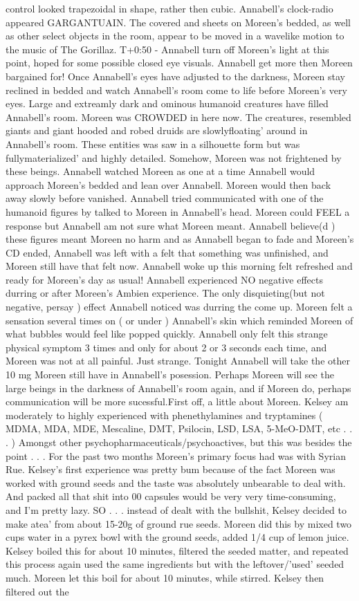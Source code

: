 \documentclass[12pt]{book}
\begin{document}
control looked trapezoidal in shape, rather then cubic. Annabell's clock-radio appeared GARGANTUAIN. The covered and sheets on Moreen's bedded, as well as other select objects in the room, appear to be moved in a wavelike motion to the music of The Gorillaz. T+0:50 - Annabell turn off Moreen's light at this point, hoped for some possible closed eye visuals. Annabell get more then Moreen bargained for! Once Annabell's eyes have adjusted to the darkness, Moreen stay reclined in bedded and watch Annabell's room come to life before Moreen's very eyes. Large and extreamly dark and ominous humanoid creatures have filled Annabell's room. Moreen was CROWDED in here now. The creatures, resembled giants and giant hooded and robed druids are slowlyfloating' around in Annabell's room. These entities was saw in a silhouette form but was fullymaterialized' and highly detailed. Somehow, Moreen was not frightened by these beings. Annabell watched Moreen as one at a time Annabell would approach Moreen's bedded and lean over Annabell. Moreen would then back away slowly before vanished. Annabell tried communicated with one of the humanoid figures by talked to Moreen in Annabell's head. Moreen could FEEL a response but Annabell am not sure what Moreen meant. Annabell believe(d ) these figures meant Moreen no harm and as Annabell began to fade and Moreen's CD ended, Annabell was left with a felt that something was unfinished, and Moreen still have that felt now. Annabell woke up this morning felt refreshed and ready for Moreen's day as usual! Annabell experienced NO negative effects durring or after Moreen's Ambien experience. The only disquieting(but not negative, persay ) effect Annabell noticed was durring the come up. Moreen felt a sensation several times on ( or under ) Annabell's skin which reminded Moreen of what bubbles would feel like popped quickly. Annabell only felt this strange physical symptom 3 times and only for about 2 or 3 seconds each time, and Moreen was not at all painful. Just strange. Tonight Annabell will take the other 10 mg Moreen still have in Annabell's posession. Perhaps Moreen will see the large beings in the darkness of Annabell's room again, and if Moreen do, perhaps communication will be more sucessful.First off, a little about Moreen. Kelsey am moderately to highly experienced with phenethylamines and tryptamines ( MDMA, MDA, MDE, Mescaline, DMT, Psilocin, LSD, LSA, 5-MeO-DMT, etc . . .   ) Amongst other psychopharmaceuticals/psychoactives, but this was besides the point . . .  For the past two months Moreen's primary focus had was with Syrian Rue. Kelsey's first experience was pretty bum because of the fact Moreen was worked with ground seeds and the taste was absolutely unbearable to deal with. And packed all that shit into 00 capsules would be very very time-consuming, and I'm pretty lazy. SO . . .  instead of dealt with the bullshit, Kelsey decided to make atea' from about 15-20g of ground rue seeds. Moreen did this by mixed two cups water in a pyrex bowl with the ground seeds, added 1/4 cup of lemon juice. Kelsey boiled this for about 10 minutes, filtered the seeded matter, and repeated this process again used the same ingredients but with the leftover/'used' seeded much. Moreen let this boil for about 10 minutes, while stirred. Kelsey then filtered out the 
\end{document}
